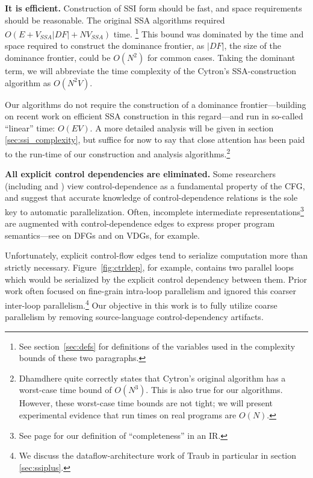 \documentclass[12pt,titlepage,twoside]{article}
\begin{document}
\textbf{It is efficient.}  Construction of SSI form should be fast,
and space requirements should be reasonable.  The original SSA
algorithms required $O(E+V_{SSA}|{DF}|+NV_{SSA})$ time.%
\footnote{See section~\ref{sec:defs} for definitions of the
variables used in the complexity bounds of these two paragraphs.}
This bound
was dominated by the time and space required to construct the
dominance frontier, as $|{DF}|$, the size of the dominance frontier,
could be $O(N^2)$ for common cases.  Taking the dominant term, we will
abbreviate the time complexity of the Cytron's SSA-construction
algorithm as $O(N^2 V)$.

Our algorithms do not require the construction of a dominance
frontier---building on recent work on efficient SSA construction in
this regard---and run in so-called ``linear'' time: $O(EV)$.  A more
detailed analysis will be given in section \ref{sec:ssi_complexity},
but suffice for now to say that
close attention has been paid to the run-time of our construction and
analysis algorithms.\footnote{Dhamdhere \cite{dhamdhere92:large} quite
correctly states that Cytron's original algorithm has a worst-case
time bound of $O(N^3)$.  This is also true for our algorithms.
However, these worst-case time bounds are not tight; we will present
experimental evidence that run times on real programs are $O(N)$.}
       

\textbf{All explicit control dependencies are eliminated.}
Some researchers (including \cite{appel:modern} and
\cite{pingali97:apt}) view control-dependence as a fundamental
property of the CFG, and \cite{ballance90:pdw,appel:modern} suggest
that accurate knowledge of control-dependence relations is the sole
key to automatic parallelization.  Often, incomplete intermediate
representations\footnote{See page \pageref{sec:complete} for our
definition of ``completeness'' in an IR.} are augmented with
control-dependence edges to express proper program semantics---see
\cite{johnson93:dfg} on DFGs and \cite{weise94:vdg} on VDGs, for
example.

Unfortunately, explicit control-flow edges tend to serialize
computation more than strictly necessary.  Figure~\vref{fig:ctrldep},
for example, contains two parallel loops which would be serialized by
the explicit control dependency between them.  Prior work often
focused on fine-grain intra-loop parallelism and ignored this coarser
inter-loop parallelism.\footnote{We discuss the dataflow-architecture
work of Traub \cite{traub86:ttda} in particular in section
\ref{sec:ssiplus}.} Our objective in this work is to fully utilize
coarse parallelism by removing source-language control-dependency artifacts.
\end{document}
